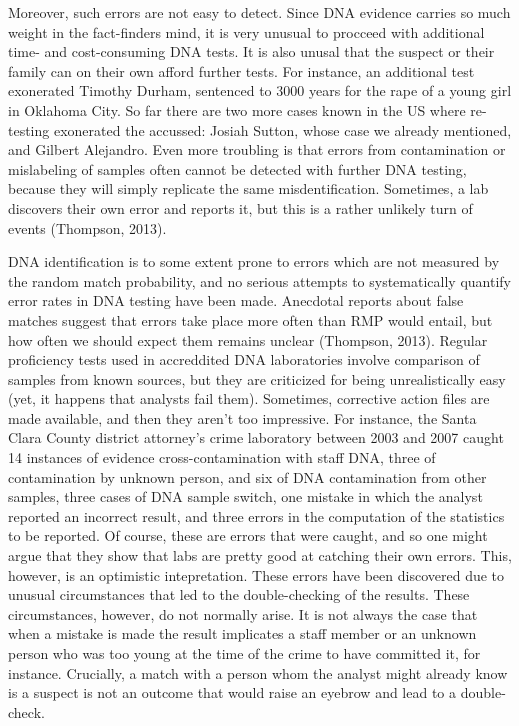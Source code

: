 \documentclass[10pt,dvipsnames,enabledeprecatedfontcommands]{scrartcl}
\begin{document}
Moreover, such errors are not easy to detect. Since DNA evidence carries
so much weight in the fact-finders mind, it is very unusual to procceed
with additional time- and cost-consuming DNA tests. It is also unusal
that the suspect or their family can on their own afford further tests.
For instance, an additional test exonerated Timothy Durham, sentenced to
3000 years for the rape of a young girl in Oklahoma City. So far there
are two more cases known in the US where re-testing exonerated the
accussed: Josiah Sutton, whose case we already mentioned, and Gilbert
Alejandro. Even more troubling is that errors from contamination or
mislabeling of samples often cannot be detected with further DNA
testing, because they will simply replicate the same misdentification.
Sometimes, a lab discovers their own error and reports it, but this is a
rather unlikely turn of events (Thompson, 2013).

DNA identification is to some extent prone to errors which are not
measured by the random match probability, and no serious attempts to
systematically quantify error rates in DNA testing have been made.
Anecdotal reports about false matches suggest that errors take place
more often than RMP would entail, but how often we should expect them
remains unclear (Thompson, 2013). Regular proficiency tests used in
accreddited DNA laboratories involve comparison of samples from known
sources, but they are criticized for being unrealistically easy (yet, it
happens that analysts fail them). Sometimes, corrective action files are
made available, and then they aren't too impressive. For instance, the
Santa Clara County district attorney's crime laboratory between 2003 and
2007 caught 14 instances of evidence cross-contamination with staff DNA,
three of contamination by unknown person, and six of DNA contamination
from other samples, three cases of DNA sample switch, one mistake in
which the analyst reported an incorrect result, and three errors in the
computation of the statistics to be reported. Of course, these are
errors that were caught, and so one might argue that they show that labs
are pretty good at catching their own errors. This, however, is an
optimistic intepretation. These errors have been discovered due to
unusual circumstances that led to the double-checking of the results.
These circumstances, however, do not normally arise. It is not always
the case that when a mistake is made the result implicates a staff
member or an unknown person who was too young at the time of the crime
to have committed it, for instance. Crucially, a match with a person
whom the analyst might already know is a suspect is not an outcome that
would raise an eyebrow and lead to a double-check.
\end{document}
